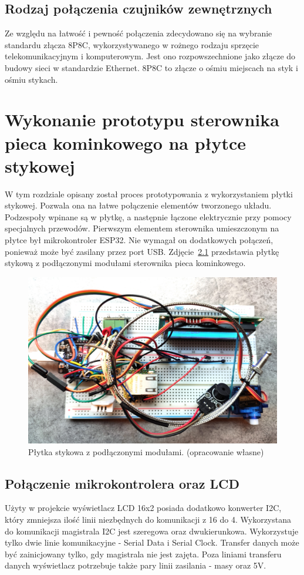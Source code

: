 \documentclass[11pt]{report}
\begin{document}
 \section{Rodzaj połączenia czujników zewnętrznych}
 Ze względu na łatwość i pewność połączenia zdecydowano się na wybranie standardu złącza 8P8C, wykorzystywanego w rożnego rodzaju sprzęcie telekomunikacyjnym i komputerowym. Jest ono rozpowszechnione jako złącze do budowy sieci w standardzie Ethernet. 8P8C to złącze o ośmiu miejscach na styk i ośmiu stykach.
 
 
 \chapter[Wykonanie prototypu sterownika pieca kominkowego\\ na płytce stykowej]{Wykonanie prototypu sterownika pieca kominkowego na płytce stykowej}\label{ch:prototyp:stykowa}
 W tym rozdziale opisany został proces prototypowania z wykorzystaniem płytki stykowej.
 Pozwala ona na łatwe połączenie elementów tworzonego układu. Podzespoły wpinane są w płytkę, a następnie łączone elektrycznie przy pomocy specjalnych przewodów.
 Pierwszym elementem sterownika umieszczonym na płytce był mikrokontroler ESP32. Nie wymagał on dodatkowych połączeń, ponieważ może być zasilany przez port USB.
    Zdjęcie~\ref{fig:stykowa} przedstawia płytkę stykową z podłączonymi modułami sterownika pieca kominkowego.
    \begin{figure}[ht]
\centering
\includegraphics[width=0.8 \textwidth]{fig/plytka_stykowa.jpg}
\caption{Płytka stykowa z podłączonymi modułami. (opracowanie własne)}
\label{fig:stykowa}
\end{figure}
  
 \section{Połączenie mikrokontrolera oraz LCD}
 Użyty w projekcie wyświetlacz LCD 16x2 posiada dodatkowo konwerter I2C, który zmniejsza ilość linii niezbędnych do komunikacji z 16 do 4. Wykorzystana do komunikacji magistrala I2C jest szeregowa oraz dwukierunkowa. Wykorzystuje tylko dwie linie komunikacyjne - Serial Data i Serial Clock. Transfer danych może być zainicjowany tylko, gdy magistrala nie jest zajęta. Poza liniami transferu danych wyświetlacz potrzebuje także pary linii zasilania - masy oraz 5V.
  
\end{document}
